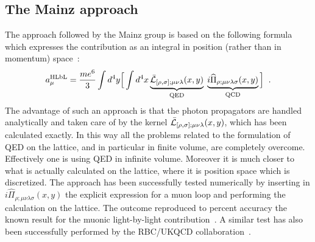 \documentclass[epj]{webofc}
\newcommand{\<}{\langle}
\renewcommand{\>}{\rangle}
\begin{document}
\subsection{The Mainz approach}\label{sec:latticeMainz}
The approach followed by the Mainz group is based on the following formula
which expresses the contribution as an integral in position (rather
than in momentum) space~\cite{Asmussen:2016lse}:
\begin{equation}
a_\mu^{\rm HLbL} = \frac{m e^6}{3}  \int d^4y
   \Big[
      \int d^4x
      \underbrace{\bar{\cal L}_{[\rho,\sigma];\mu\nu\lambda}(x,y)}_{\rm QED}\;
      \underbrace{i\widehat\Pi_{\rho;\mu\nu\lambda\sigma}(x,y)}_{\rm QCD}
   \Big] \; \;.
\end{equation}
The advantage of such an approach is that the photon propagators are
handled analytically and taken care of by the kernel $\bar{\cal
  L}_{[\rho,\sigma];\mu\nu\lambda}(x,y)$, which has been calculated
exactly. In this way all the problems related to the formulation of QED on 
the lattice, and in particular in finite volume, are completely
overcome. Effectively one is using QED in infinite volume. 
Moreover it is much closer to what is actually calculated on the lattice,
where it is position space which is discretized. 
The approach has been successfully tested numerically by inserting in
$i\widehat\Pi_{\rho;\mu\nu\lambda\sigma}(x,y)$ the explicit expression for
a muon loop and performing the calculation on the lattice. The outcome
reproduced to percent accuracy the known result for the muonic
light-by-light contribution~\cite{AsmussenLat17}. A similar test has also
been successfully performed by the RBC/UKQCD
collaboration~\cite{Blum:2017cer}. 
\end{document}
